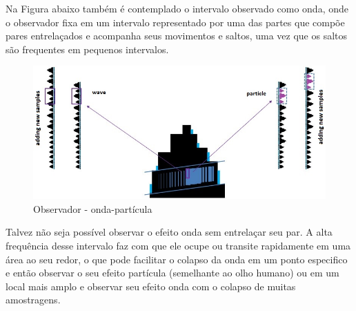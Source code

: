 Na Figura abaixo também é contemplado o intervalo observado como onda, onde o observador fixa em um intervalo representado por uma das partes que compõe pares entrelaçados e acompanha seus movimentos e saltos, uma vez que os saltos são frequentes em pequenos intervalos. 
	\begin{figure}[H]
	\caption{Observador - onda-partícula}
	\label{fig:consciousness_space_wave-particle}
	\centering
	\includegraphics[scale=.55]{sections/images/consciousness_space_wave-particle.jpg}
	\end{figure}

Talvez não seja possível observar o efeito onda sem entrelaçar seu par. A alta frequência desse intervalo faz com que ele ocupe ou transite rapidamente em uma área ao seu redor, o que pode facilitar o colapso da onda em um ponto especifico e então observar o seu efeito partícula (semelhante ao olho humano) ou em um local mais amplo e observar seu efeito onda com o colapso de muitas amostragens.
